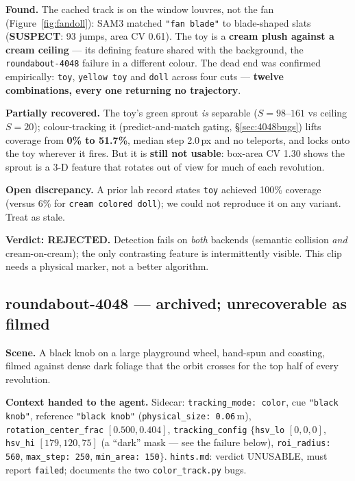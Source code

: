 \documentclass[11pt,a4paper]{article}
\newcommand{\susp}{\textcolor{bad}{\textbf{SUSPECT}}}
\begin{document}
\textbf{Found.} The cached track is on the window louvres, not the fan (Figure~\ref{fig:fandoll}):
SAM3 matched \texttt{"fan blade"} to blade-shaped slats (\susp{}: 93 jumps, area CV 0.61). The toy is
a \textbf{cream plush against a cream ceiling} --- its defining feature shared with the background,
the \texttt{roundabout-4048} failure in a different colour. The dead end was confirmed empirically:
\texttt{toy}, \texttt{yellow toy} and \texttt{doll} across four cuts --- \textbf{twelve combinations,
every one returning no trajectory}.

\textbf{Partially recovered.} The toy's green sprout \emph{is} separable ($S=98$--$161$ vs ceiling
$S=20$); colour-tracking it (predict-and-match gating, \S\ref{sec:4048bugs}) lifts coverage from
\textbf{0\% to 51.7\%}, median step 2.0\,px and no teleports, and locks onto the toy wherever it
fires. But it is \textbf{still not usable}: box-area CV 1.30 shows the sprout is a 3-D feature that
rotates out of view for much of each revolution.

\textbf{Open discrepancy.} A prior lab record states \texttt{toy} achieved 100\% coverage (versus
6\% for \texttt{cream colored doll}); we could not reproduce it on any variant. Treat as stale.

\textbf{Verdict: REJECTED.} Detection fails on \emph{both} backends (semantic collision \emph{and}
cream-on-cream); the only contrasting feature is intermittently visible. This clip needs a physical
marker, not a better algorithm.

\subsection{roundabout-4048 --- archived; unrecoverable as filmed}

\textbf{Scene.} A black knob on a large playground wheel, hand-spun and coasting, filmed against
dense dark foliage that the orbit crosses for the top half of every revolution.

\textbf{Context handed to the agent.} Sidecar: \texttt{tracking\_mode: color}, cue
\texttt{"black knob"}, reference \texttt{"black knob"} (\texttt{physical\_size: 0.06}\,m),
\texttt{rotation\_center\_frac} $[0.500,0.404]$, \texttt{tracking\_config} $\{$\texttt{hsv\_lo}
$[0,0,0]$, \texttt{hsv\_hi} $[179,120,75]$ (a ``dark'' mask --- see the failure below),
\texttt{roi\_radius: 560}, \texttt{max\_step: 250}, \texttt{min\_area: 150}$\}$. \texttt{hints.md}:
verdict UNUSABLE, must report \texttt{failed}; documents the two \texttt{color\_track.py} bugs.
\end{document}
